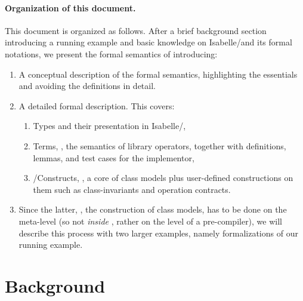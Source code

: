 \paragraph*{Organization of this document.}
This document is organized as follows. After a brief background section
introducing a running example and basic knowledge on Isabelle/\HOL and its formal
notations, we present the formal semantics of  \FOCL introducing:
\begin{enumerate}
\item A conceptual description of the formal semantics, highlighting the essentials
      and avoiding the definitions in detail.
\item A detailed formal description. This covers:
\begin{enumerate}
\item \OCL Types and their presentation in Isabelle/\HOL,
\item \OCL Terms, \ie, the semantics of library operators,
        together with definitions, lemmas, and test cases for the implementor,
\item \UML/\OCL Constructs, \ie, a core of \UML class models plus user-defined
        constructions on them such as class-invariants and operation contracts.
\end{enumerate}
\item Since the latter, \ie, the construction of \UML class models, has to be done on the meta-level
(so not \emph{inside} \HOL, rather on the level of a pre-compiler), we will describe this process
with two larger examples, namely formalizations of our running example.
\end{enumerate}



\section{Background}
\isatagafp
